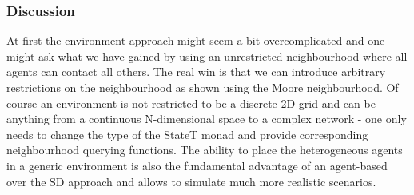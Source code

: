 \subsubsection{Discussion}
At first the environment approach might seem a bit overcomplicated and one might ask what we have gained by using an unrestricted neighbourhood where all agents can contact all others. The real win is that we can introduce arbitrary restrictions on the neighbourhood as shown using the Moore neighbourhood. Of course an environment is not restricted to be a discrete 2D grid and can be anything from a continuous N-dimensional space to a complex network - one only needs to change the type of the StateT monad and provide corresponding neighbourhood querying functions. The ability to place the heterogeneous agents in a generic environment is also the fundamental advantage of an agent-based over the SD approach and allows to simulate much more realistic scenarios. 

